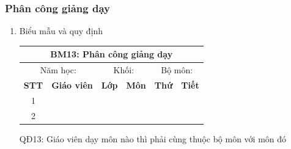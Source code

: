 \documentclass[a4paper]{article}
\begin{document}
								\subsubsection{Phân công giảng dạy}	
								\begin{enumerate}
\item Biểu mẫu và quy định

\begin{table}[H]
	\centering
	 \renewcommand{\arraystretch}{1.5}
	   \setlength{\tabcolsep}{15pt}
	 \begin{tabular}{|c|c|c|c|c|c|}
	 \hline
	 \multicolumn{6}{|c|}{\textbf{BM13: Phân công giảng dạy}} \\
	 \hline
	 \multicolumn{2}{|c|}{Năm học: } & \multicolumn{2}{|c|}{Khối: } & \multicolumn{2}{|c|}{Bộ môn: } \\
	 \hline
	 \textbf{STT} & \textbf{Giáo viên} & \textbf{Lớp} & \textbf{Môn} & \textbf{Thứ} & \textbf{Tiết} \\
	 \hline
	 1 & & & & & \\
	 \hline
	 2 & & & & &\\
	 \hline
	 \end{tabular}
	\end{table}

QĐ13: Giáo viên dạy môn nào thì phải cùng thuộc bộ môn với môn đó


\end{enumerate}
\end{document}
